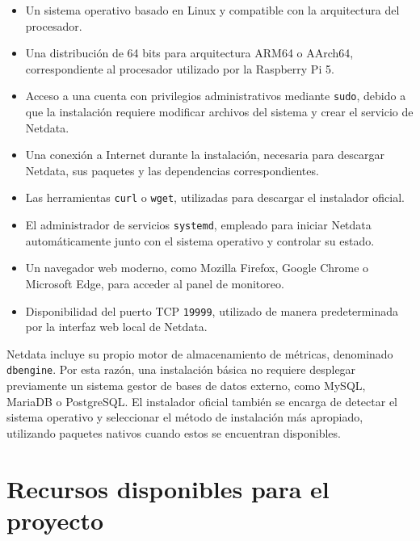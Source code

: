 \begin{itemize}
    \item Un sistema operativo basado en Linux y compatible con la arquitectura del procesador.
    
    \item Una distribución de 64 bits para arquitectura ARM64 o AArch64, correspondiente al procesador utilizado por la Raspberry Pi 5.
    
    \item Acceso a una cuenta con privilegios administrativos mediante \texttt{sudo}, debido a que la instalación requiere modificar archivos del sistema y crear el servicio de Netdata.
    
    \item Una conexión a Internet durante la instalación, necesaria para descargar Netdata, sus paquetes y las dependencias correspondientes.
    
    \item Las herramientas \texttt{curl} o \texttt{wget}, utilizadas para descargar el instalador oficial.
    
    \item El administrador de servicios \texttt{systemd}, empleado para iniciar Netdata automáticamente junto con el sistema operativo y controlar su estado.
    
    \item Un navegador web moderno, como Mozilla Firefox, Google Chrome o Microsoft Edge, para acceder al panel de monitoreo.
    
    \item Disponibilidad del puerto TCP \texttt{19999}, utilizado de manera predeterminada por la interfaz web local de Netdata. \cite{netdata-seguridad}
\end{itemize}

Netdata incluye su propio motor de almacenamiento de métricas, denominado \texttt{dbengine}. Por esta razón, una instalación básica no requiere desplegar previamente un sistema gestor de bases de datos externo, como MySQL, MariaDB o PostgreSQL. El instalador oficial también se encarga de detectar el sistema operativo y seleccionar el método de instalación más apropiado, utilizando paquetes nativos cuando estos se encuentran disponibles. \cite{netdata-arquitecturas}

\section{Recursos disponibles para el proyecto}

